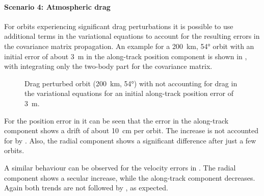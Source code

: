 \paragraph{Scenario 4: Atmospheric drag}

For orbits experiencing significant drag perturbations it is possible to use additional terms in the variational equations to account for the resulting errors 
in the covariance matrix propagation. An example for a \SI{200}{\kilo\metre}, \ang{54;;} orbit with an initial error of about \SI{3}{\metre} in the along-track position component is shown in , with \neptune integrating only the two-body part for the covariance matrix.
\begin{figure}[h!]
  \centering
  \hspace{1cm}
  \caption{Drag perturbed orbit (\SI{200}{\kilo\metre}, \ang{54;;}) with \neptune not accounting for drag in the variational equations for an initial along-track position 
error of \SI{3}{\metre}. \label{fig:val-cov-scen4-01}}
\end{figure}
For the position error in  it can be seen that the error in the along-track component shows a drift of about \SI{10}{\centi\metre} per orbit. The 
increase is not accounted for by \neptune{}. Also, the radial component shows a significant difference after just a few orbits.

A similar behaviour can be observed for the velocity errors in . The radial component shows a secular increase, while the 
along-track component decreases. Again both trends are not followed by \neptune{}, as expected.